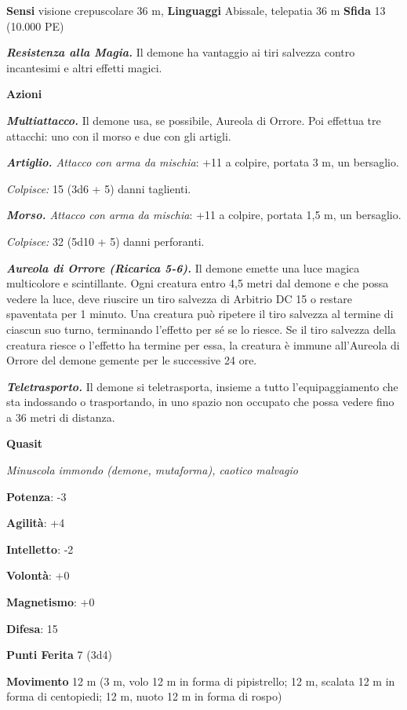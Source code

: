 \begin{multicols}{2}
\textbf{Sensi} visione crepuscolare 36 m, 
\textbf{Linguaggi} Abissale, telepatia 36 m \textbf{Sfida} 13 (10.000
PE)

\emph{\textbf{Resistenza alla Magia.}} Il demone ha vantaggio ai tiri
salvezza contro incantesimi e altri effetti magici.

\textbf{Azioni}

\emph{\textbf{Multiattacco.}} Il demone usa, se possibile, Aureola di
Orrore. Poi effettua tre attacchi: uno con il morso e due con gli
artigli.

\emph{\textbf{Artiglio.} Attacco con arma da mischia}: +11 a colpire,
portata 3 m, un bersaglio.

\emph{Colpisce:} 15 (3d6 + 5) danni taglienti.

\emph{\textbf{Morso.} Attacco con arma da mischia}: +11 a colpire,
portata 1,5 m, un bersaglio.

\emph{Colpisce:} 32 (5d10 + 5) danni perforanti.

\emph{\textbf{Aureola di Orrore (Ricarica 5-6).}} Il demone emette una
luce magica multicolore e scintillante. Ogni creatura entro 4,5 metri
dal demone e che possa vedere la luce, deve riuscire un tiro salvezza di Arbitrio DC 15 o restare spaventata per 1 minuto. Una creatura può
ripetere il tiro salvezza al termine di ciascun suo turno, terminando
l'effetto per sé se lo riesce. Se il tiro salvezza della creatura riesce
o l'effetto ha termine per essa, la creatura è immune all'Aureola di
Orrore del demone gemente per le successive 24 ore.

\emph{\textbf{Teletrasporto.}} Il demone si teletrasporta, insieme a
tutto l'equipaggiamento che sta indossando o trasportando, in uno spazio
non occupato che possa vedere fino a 36 metri di distanza.



\textbf{Quasit}

\emph{Minuscola immondo (demone, mutaforma), caotico malvagio}

\textbf{Potenza}: -3

\textbf{Agilità}: +4

\textbf{Intelletto}: -2

\textbf{Volontà}: +0

\textbf{Magnetismo}: +0

\textbf{Difesa}: 15

\textbf{Punti Ferita} 7 (3d4)

\textbf{Movimento} 12 m (3 m, volo 12 m in forma di pipistrello; 12 m,
scalata 12 m in forma di centopiedi; 12 m, nuoto 12 m in forma di rospo)


\end{multicols}
